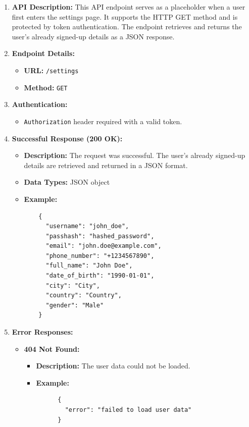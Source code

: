 \documentclass[a4 paper, 12pt]{article}
\begin{document}
\begin{enumerate}
  \item \textbf{API Description:} This API endpoint serves as a placeholder when a user first enters the settings page. It supports the HTTP GET method and is protected by token authentication. The endpoint retrieves and returns the user's already signed-up details as a JSON response.

  \item \textbf{Endpoint Details:}
  \begin{itemize}
    \item \textbf{URL:} \texttt{/settings}
    \item \textbf{Method:} \texttt{GET}
  \end{itemize}

  \item \textbf{Authentication:}
  \begin{itemize}
    \item \texttt{Authorization} header required with a valid token.
  \end{itemize}

  \item \textbf{Successful Response (200 OK):}
  \begin{itemize}
    \item \textbf{Description:} The request was successful. The user's already signed-up details are retrieved and returned in a JSON format.
    \item \textbf{Data Types:} JSON object
    \item \textbf{Example:}
    \begin{verbatim}
    {
      "username": "john_doe",
      "passhash": "hashed_password",
      "email": "john.doe@example.com",
      "phone_number": "+1234567890",
      "full_name": "John Doe",
      "date_of_birth": "1990-01-01",
      "city": "City",
      "country": "Country",
      "gender": "Male"
    }
    \end{verbatim}
  \end{itemize}

  \item \textbf{Error Responses:}
  \begin{itemize}
    \item \textbf{404 Not Found:}
    \begin{itemize}
      \item \textbf{Description:} The user data could not be loaded.
      \item \textbf{Example:}
      \begin{verbatim}
      {
        "error": "failed to load user data"
      }
      \end{verbatim}
    \end{itemize}


\end{itemize}
\end{enumerate}
\end{document}
